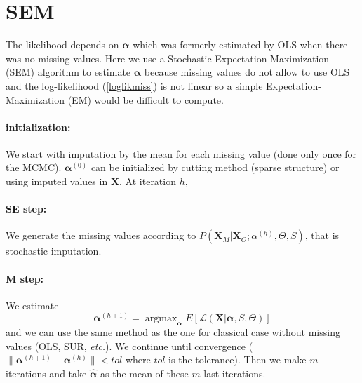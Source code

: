 \documentclass[12pt,a4paper]{report}
\begin{document}
%
%

\section{SEM}
	The likelihood depends on $\boldsymbol{\alpha}$ which was formerly estimated by OLS when there was no missing values.
	Here we use a  Stochastic Expectation Maximization (SEM) algorithm \cite{celeux1986algorithme} to estimate $\boldsymbol{\alpha}$ because missing values do not allow to use OLS and  the log-likelihood (\ref{loglikmiss}) is not linear so a simple Expectation-Maximization (EM) would be difficult to compute.
	\paragraph{initialization:} We start with imputation by the mean for each missing value (done only once for the MCMC). $\boldsymbol{\alpha}^{(0)}$ can be initialized by cutting method	(sparse structure) or using imputed values in $\boldsymbol{X}$.
	At iteration $h$,
	\paragraph{SE step:}
		We generate the missing values according to $P(\boldsymbol{X}_M|\boldsymbol{X}_O; \alpha^{(h)},\Theta,S)$, that is stochastic imputation.
	\paragraph{M step:}
		We estimate 
		\begin{equation}
	\boldsymbol{\alpha}^{(h+1)}=\operatorname{argmax}_{\boldsymbol{\alpha}}E\left[\mathcal{L}(\boldsymbol{X}|\boldsymbol{\alpha},S,\Theta) \right]
\end{equation}
and we can use the same method as the one for classical case without missing values (OLS, SUR, {\it etc.}).
		We continue until convergence ($\parallel \boldsymbol{\alpha}^{(h+1)} - \boldsymbol{\alpha}^{(h)}\parallel < tol $ where $tol$ is the tolerance). Then we make $m$ iterations and take $\hat{\boldsymbol{\alpha}}$ as the mean of these $m$ last iterations.
		
\end{document}
